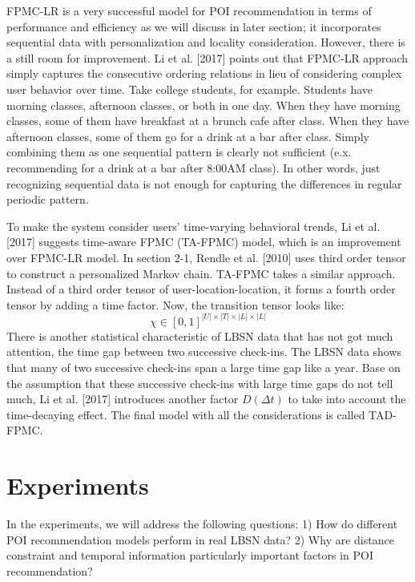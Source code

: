 \documentclass{sig-alternate}
\begin{document}
FPMC-LR is a very successful model for POI recommendation in terms of performance and efficiency 
as we will discuss in later section; it incorporates sequential data with personalization and locality consideration. 
However, there is a still room for improvement. Li et al. [2017] points out that FPMC-LR approach simply captures 
the consecutive ordering relations in lieu of considering complex user behavior over time. Take college students, 
for example. Students have morning classes, afternoon classes, or both in one day. When they have morning classes, 
some of them have breakfast at a brunch cafe after class. When they have afternoon classes, some of them go 
for a drink at a bar after class. Simply combining them as one sequential pattern is clearly not sufficient (e.x. recommending 
for a drink at a bar after 8:00AM class). In other words, just recognizing sequential data is not 
enough for capturing the differences in regular periodic pattern.

To make the system consider users' time-varying behavioral trends, Li et al. [2017] suggests time-aware FPMC (TA-FPMC) 
model, which is an improvement over FPMC-LR model. In section 2-1, Rendle et al. [2010] uses third order tensor to 
construct a personalized Markov chain. TA-FPMC takes a similar approach. Instead of a third order tensor of 
user-location-location, it forms a fourth order tensor by adding a time factor. Now, the transition tensor looks like: 
\begin{equation}
	\chi \in [0, 1]^{|U| \times |T| \times |L| \times |L|}
\label{eq:TA-FPMC_tensor}
\end{equation}
There is another statistical characteristic of LBSN data that has not got much attention, the time gap between 
two successive check-ins. The LBSN data shows that many of two successive check-ins span a large time gap 
like a year. Base on the assumption that these successive check-ins with large time gaps do not tell much, 
Li et al. [2017] introduces another factor $D(\Delta t)$ to take into account the time-decaying effect. 
The final model with all the considerations is called TAD-FPMC.

\section{Experiments}
\label{sec:experiments}
In the experiments, we will address the following questions: 1) How do different POI recommendation 
models perform in real LBSN data? 2) Why are distance constraint and temporal information particularly important 
factors in POI recommendation?
\end{document}
